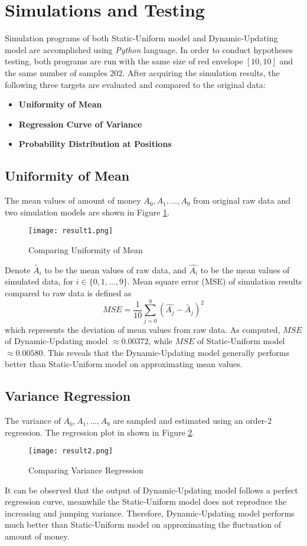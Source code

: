 \documentclass[10pt,journal]{IEEEtran}
\begin{document}
\section{Simulations and Testing}
Simulation programs of both Static-Uniform model and Dynamic-Updating model are accomplished using \textit{Python} language. In order to conduct hypotheses testing, both programs are run with the same size of red envelope $[10, 10]$ and the same number of samples $202$. After acquiring the simulation results, the following three targets are evaluated and compared to the original data:
\begin{itemize}
	\item \textbf{Uniformity of Mean}
	\item \textbf{Regression Curve of Variance}
	\item \textbf{Probability Distribution at Positions}
\end{itemize}
\subsection{Uniformity of Mean}
The mean values of amount of money $A_0, A_1, \dots , A_9$ from original raw data and two simulation models are shown in Figure \ref{fig:result1}.
\begin{figure}[H]
	\centering
	\texttt{[image: result1.png]}
	\caption{Comparing Uniformity of Mean} \label{fig:result1}
\end{figure}
Denote $\tilde{A_i}$ to be the mean values of raw data, and $\hat{A_i}$ to be the mean values of simulated data, for $i \in \{0, 1, \dots ,9\}$. Mean square error (MSE) of simulation results compared to raw data is defined as
\[
	MSE = \frac{1}{10} \sum_{j=0}^9 (\hat{A_j} - \tilde{A_j})^2
\]
which represents the deviation of mean values from raw data. As computed, $MSE$ of Dynamic-Updating model $\approx 0.00372$, while $MSE$ of Static-Uniform model $\approx 0.00580$. This reveals that the Dynamic-Updating model generally performs better than Static-Uniform model on approximating mean values.
\subsection{Variance Regression}
The variance of $A_0, A_1, \dots , A_9$ are sampled and estimated using an order-$2$ regression. The regression plot in shown in Figure \ref{fig:result2}.
\begin{figure}[H]
	\centering
	\texttt{[image: result2.png]}
	\caption{Comparing Variance Regression} \label{fig:result2}
\end{figure}
It can be observed that the output of Dynamic-Updating model follows a perfect regression curve, meanwhile the Static-Uniform model does not reproduce the increasing and jumping variance. Therefore, Dynamic-Updating model performs much better than Static-Uniform model on approximating the fluctuation of amount of money.
\end{document}
